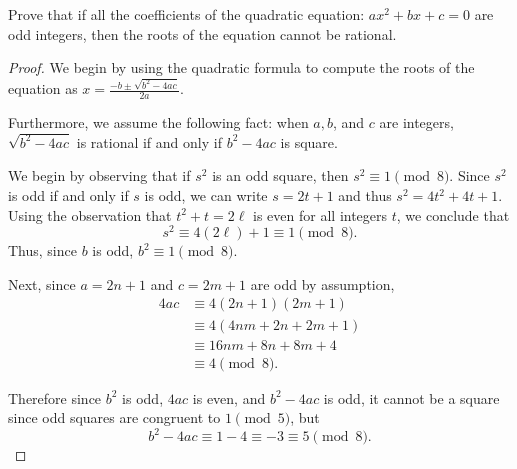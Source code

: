 \begin{proposition}
Prove that if all the coefficients of the quadratic equation: \(ax^2 + bx + c = 0\) are odd integers, then the roots of the equation cannot be rational.
\end{proposition}
\begin{proof}
We begin by using the quadratic formula to compute the roots of the equation as \(\displaystyle
  x = \frac{-b \pm \sqrt{b^2 - 4ac}}{2a}.
\)

Furthermore, we assume the following fact: when $a, b$, and $c$ are integers, $\sqrt{b^2 - 4ac}$ is rational if and only if $b^2 - 4ac$ is square.

We begin by observing that if $s^2$ is an odd square, then $s^2 \equiv 1 \pmod 8$. Since $s^2$ is odd if and only if $s$ is odd, we can write $s = 2t + 1$ and thus $s^2 = 4t^2 + 4t + 1$. Using the observation that $t^2 + t = 2\ell$ is even for all integers $t$, we conclude that \[
  s^2 \equiv 4(2\ell) + 1 \equiv 1 \pmod 8.
\] Thus, since $b$ is odd, $b^2 \equiv 1 \pmod 8$.

Next, since $a = 2n + 1$ and $c = 2m + 1$ are odd by assumption,
\begin{align*}
  4ac &\equiv 4(2n+1)(2m+1)\\
  &\equiv 4(4nm+2n+2m+1)\\
  &\equiv 16nm+8n+8m+4 \\
  &\equiv 4 \pmod 8.
\end{align*}

Therefore since $b^2$ is odd, $4ac$ is even, and $b^2 - 4ac$ is odd, it cannot be a square since odd squares are congruent to $1 \pmod 5$, but \[
  b^2 - 4ac \equiv 1 - 4 \equiv -3 \equiv 5 \pmod 8.
\]

\end{proof}
